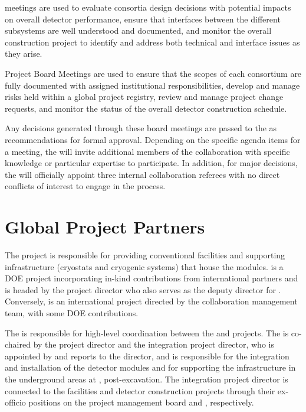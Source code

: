  meetings are used to evaluate consortia design
decisions with potential impacts on overall detector performance,
ensure that interfaces between the different subsystems are well
understood and documented, and monitor the overall construction
project to identify and address both technical and interface issues as
they arise.

Project Board Meetings are used to ensure that the scopes of each
consortium are fully documented with assigned institutional
responsibilities, develop and manage risks held within a global
project registry, review and manage project change requests, and
monitor the status of the overall detector construction schedule.

Any decisions generated through these board meetings are passed to the
  as recommendations for formal approval.
Depending on the specific agenda items %
for a meeting, the  will invite additional members of
the collaboration with specific knowledge or particular expertise to
participate.  In addition, for major decisions, the 
will officially appoint three internal collaboration
referees with no direct conflicts of interest to engage in the
process.

\section{Global Project Partners}
\label{sec:partners}


The  project is responsible for providing conventional
facilities and supporting infrastructure (cryostats and cryogenic
systems) 
 that house the   modules.  is a  DOE
project incorporating in-kind contributions from international
partners and is headed by the  project director who also serves as
the  deputy director for .  Conversely,  is an
international project 
directed by the  collaboration management team, with some  DOE contributions. 

The  is responsible for
high-level coordination between the  and 
projects.  The  is co-chaired by the  project director and the
integration project director, who is appointed by and reports to the
  director, and is responsible for the integration and
installation of the detector modules and for supporting the  
infrastructure in the underground areas at , post-excavation.  The
integration project director is connected to the facilities and
detector construction projects through their ex-officio positions on
the  project management board and  ,
respectively.

